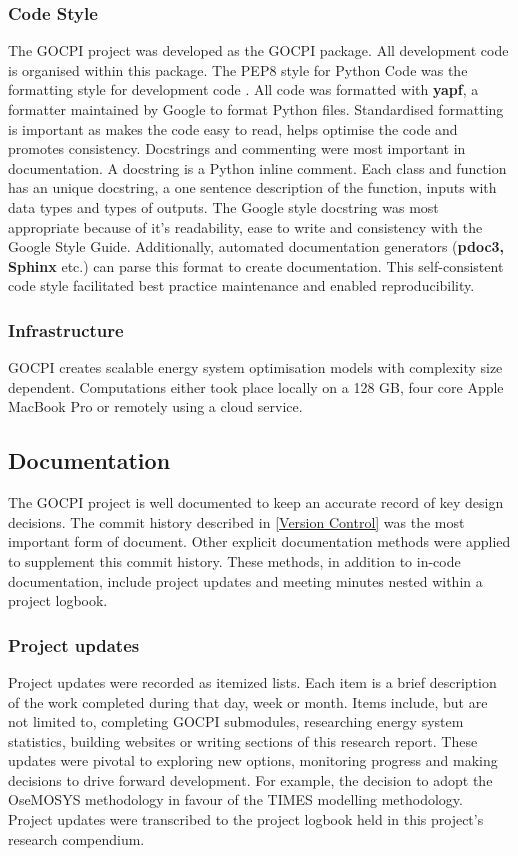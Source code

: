 \documentclass[10pt]{article}
\begin{document}
\subsubsection{Code Style} \label{CS}
The GOCPI project was developed as the GOCPI package. All development code is organised within this package.
The PEP8 style for Python Code was the formatting style for development code \cite{PEP8}. 
All code was formatted with \textbf{yapf}, a formatter maintained by Google to format Python files.
Standardised formatting is important as makes the code easy to read, helps optimise the code and promotes consistency.
Docstrings and commenting were most important in documentation. A docstring is a Python inline comment. 
Each class and function has an unique docstring, a one sentence description of the function, inputs with data types and types of outputs.
The Google style docstring was most appropriate because of it's readability, ease to write and consistency with the Google Style Guide.
Additionally, automated documentation generators (\textbf{pdoc3, Sphinx} etc.) can parse this format to create documentation.
This self-consistent code style facilitated best practice maintenance and enabled reproducibility.

\subsubsection{Infrastructure}
GOCPI creates scalable energy system optimisation models with complexity size dependent.
Computations either took place locally on a 128 GB, four core Apple MacBook Pro or remotely using a cloud service. 

\subsection{Documentation}
The GOCPI project is well documented to keep an accurate record of key design decisions.
The commit history described in \ref{Version Control} was the most important form of document.
Other explicit documentation methods were applied to supplement this commit history. 
These methods, in addition to in-code documentation, include project updates and meeting minutes
nested within a project logbook.

\subsubsection{Project updates}
Project updates were recorded as itemized lists.
Each item is a brief description of the work completed during that day, week or month.
Items include, but are not limited to, completing GOCPI submodules, researching energy system statistics, building websites or writing sections of this research report.
These updates were pivotal to exploring new options, monitoring progress and making decisions to drive forward development. 
For example, the decision to adopt the OseMOSYS methodology in favour of the TIMES modelling methodology.
Project updates were transcribed to the project logbook held in this project's research compendium.
\end{document}
